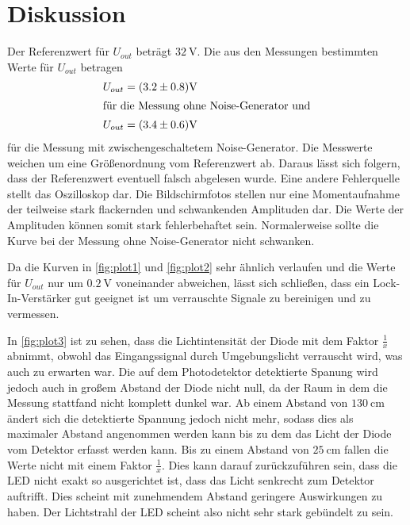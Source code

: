 \section{Diskussion}
\label{sec:Diskussion}

Der Referenzwert für $U_{out}$ beträgt $\qty{32}{\volt}$.
Die aus den Messungen bestimmten Werte für $U_{out}$ betragen
\begin{align*}
    U_{out} &= (3.2 \pm 0.8) \si{\volt}\\
    \intertext{für die Messung ohne Noise-Generator und}
    U_{out} &= (3.4 \pm 0.6) \si{\volt}
\end{align*}
für die Messung mit zwischengeschaltetem Noise-Generator.
Die Messwerte weichen um eine Größenordnung vom Referenzwert ab. Daraus lässt sich folgern, dass der Referenzwert eventuell falsch abgelesen wurde.
Eine andere Fehlerquelle stellt das Oszilloskop dar. Die Bildschirmfotos stellen nur eine Momentaufnahme der teilweise stark flackernden und schwankenden 
Amplituden dar. Die Werte der Amplituden können somit stark fehlerbehaftet sein. Normalerweise sollte die Kurve bei der Messung ohne Noise-Generator nicht
schwanken.

Da die Kurven in \autoref{fig:plot1} und \autoref{fig:plot2} sehr ähnlich verlaufen und die Werte für $U_{out}$ nur um $\qty{0.2}{\volt}$ voneinander abweichen,
lässt sich schließen, dass ein Lock-In-Verstärker gut geeignet ist um verrauschte Signale zu bereinigen und zu vermessen.


In \autoref{fig:plot3} ist zu sehen, dass die Lichtintensität der Diode mit dem Faktor $\frac{1}{x}$ abnimmt, obwohl das Eingangssignal durch Umgebungslicht verrauscht wird, was auch zu erwarten war.
Die auf dem Photodetektor detektierte Spanung wird jedoch auch in großem Abstand der Diode nicht null, da der Raum in dem die Messung stattfand nicht komplett dunkel war.
Ab einem Abstand von $\qty{130}{\centi\meter}$ ändert sich die detektierte Spannung jedoch nicht mehr, sodass dies als maximaler Abstand angenommen werden kann
bis zu dem das Licht der Diode vom Detektor erfasst werden kann.
Bis zu einem Abstand von $\qty{25}{\centi\meter}$ fallen die Werte nicht mit einem Faktor $\frac{1}{x}$. Dies kann darauf zurückzuführen sein,
dass die LED nicht exakt so ausgerichtet ist, dass das Licht senkrecht zum Detektor auftrifft. Dies scheint mit zunehmendem Abstand geringere Auswirkungen
zu haben. Der Lichtstrahl der LED scheint also nicht sehr stark gebündelt zu sein.
